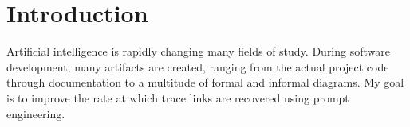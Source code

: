 
\chapter{Introduction}
\label{ch:Introduction}

Artificial intelligence is rapidly changing many fields of study.
During software development, many artifacts are created, ranging from the actual project code through documentation to a multitude of formal and informal diagrams. My goal is to improve the rate at which trace links are recovered using prompt engineering. 